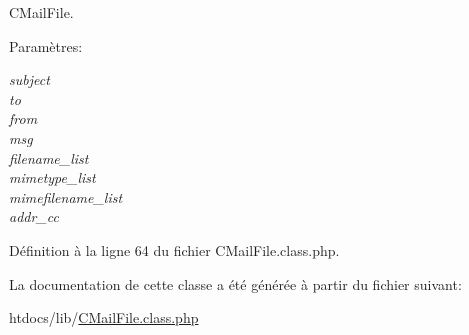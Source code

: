 CMail\-File. 

\begin{Desc}
\item[Param\`{e}tres:]
\begin{description}
\item[{\em subject}]\item[{\em to}]\item[{\em from}]\item[{\em msg}]\item[{\em filename\_\-list}]\item[{\em mimetype\_\-list}]\item[{\em mimefilename\_\-list}]\item[{\em addr\_\-cc}]\end{description}
\end{Desc}


D\'{e}finition \`{a} la ligne 64 du fichier CMail\-File.class.php.

La documentation de cette classe a \'{e}t\'{e} g\'{e}n\'{e}r\'{e}e \`{a} partir du fichier suivant:\begin{CompactItemize}
\item 
htdocs/lib/\hyperlink{CMailFile_8class_8php}{CMail\-File.class.php}\end{CompactItemize}
